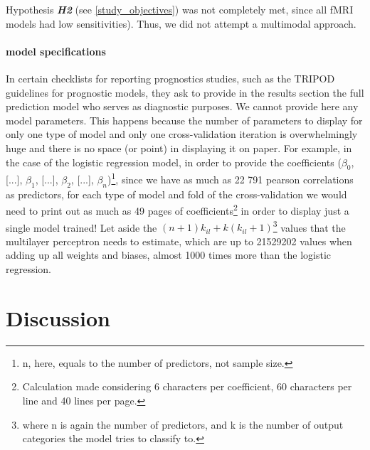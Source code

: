 \documentclass[a4paper,12pt]{elsarticle}  %
\begin{document}
		Hypothesis \textit{\textbf{H2}} (see \ref{study_objectives}) was not completely met, since all fMRI models had low sensitivities). Thus, we did not attempt a multimodal approach.
		
		

		\subsection{model specifications} %
		
		In certain checklists for reporting prognostics studies, such as the TRIPOD guidelines for prognostic models\cite{Collins2015}, they ask to provide in the results section the full prediction model who serves as diagnostic purposes. We cannot provide here any model parameters. This happens because the number of parameters to display for only one type of model and only one cross-validation iteration is overwhelmingly huge and there is no space (or point) in displaying it on paper. For example, in the case of the logistic regression model, in order to provide the coefficients ($\beta_{0}$, [...], $\beta_{1}$, [...], $\beta_{2}$, [...], $\beta_{n}$)\footnote{n, here, equals to the number of predictors, not sample size.}, since we have as much as 22 791 pearson correlations as predictors, for each type of model and fold of the cross-validation we would need to print out as much as 49 pages of coefficients\footnote{Calculation made considering 6 characters per coefficient, 60 characters per line and 40 lines per page.} in order to display just a single model trained! Let aside the $(n+1)k_{il} + k(k_{il}+1)$\footnote{where n is again the number of predictors, and k is the number of output categories the model tries to classify to.} values that the multilayer perceptron needs to estimate, which are up to 21529202 values when adding up all weights and biases, almost 1000 times more than the logistic regression.
		

\FloatBarrier













\clearpage
\part{Discussion}
\end{document}
